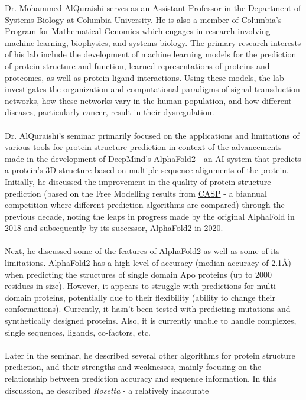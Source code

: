 \documentclass[hidelinks,11pt]{article}
\begin{document}
Dr. Mohammed AlQuraishi serves as an Assistant Professor in the Department of Systems Biology
at Columbia University. He is also a member of Columbia's Program for Mathematical Genomics
which engages in research involving machine learning, biophysics, and systems biology.
The primary research interests of his lab include the development of machine learning models
for the prediction of protein structure and function, learned representations of proteins
and proteomes, as well as protein-ligand interactions. Using these models, the lab 
investigates the organization and computational paradigms of signal transduction networks,
how these networks vary in the human population, and how different diseases, particularly
cancer, result in their dysregulation.
\\\\
Dr. AlQuraishi's seminar primarily focused on the applications and limitations of various
tools for protein structure prediction in context of the advancements made in the development
of DeepMind's AlphaFold2 - an AI system that predicts a protein's 3D structure based on
multiple sequence alignments of the protein. Initially, he discussed the improvement in the 
quality of protein structure prediction (based on the Free Modelling results from \href{https://predictioncenter.org/}{CASP} - a biannual competition where different prediction algorithms are compared)
through the previous decade, noting the leaps in progress made by the original AlphaFold in
2018 and subsequently by its successor, AlphaFold2 in 2020.
\\\\
Next, he discussed some of the features of AlphaFold2 as well as some of its limitations.
AlphaFold2 has a high level of accuracy (median accuracy of 2.1\AA) when predicting the structures
of single domain Apo proteins (up to 2000 residues in size). However, it appears to struggle
with predictions for multi-domain proteins, potentially due to their flexibility (ability to
change their conformations). Currently, it hasn't been tested with predicting mutations and
synthetically designed proteins. Also, it is currently unable to handle complexes, single sequences,
ligands, co-factors, etc.
\\\\
Later in the seminar, he described several other algorithms for protein structure prediction,
and their strengths and weaknesses, mainly focusing on the relationship between prediction
accuracy and sequence information. In this discussion, he described \emph{Rosetta} - a relatively inaccurate
\end{document}
